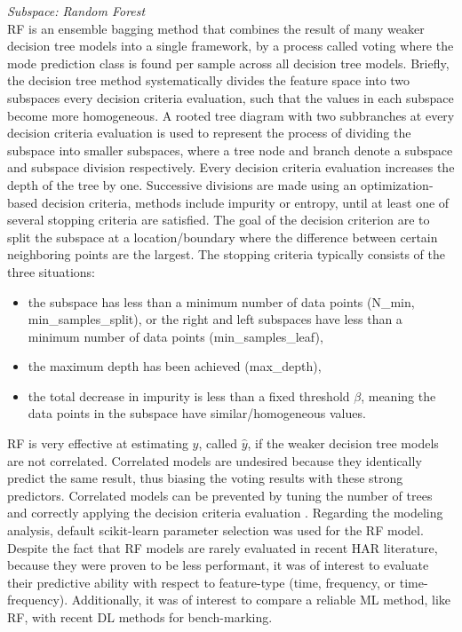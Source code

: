 \documentclass{ieeeaccess}
\begin{document}
\noindent \emph{Subspace: Random Forest}\\
RF is an ensemble bagging method that combines the result of many weaker decision tree models into a single framework, by a process called voting where the mode prediction class is found per sample across all decision tree models. Briefly, the decision tree method systematically divides the feature space into two subspaces every decision criteria evaluation, such that the values in each subspace become more homogeneous. A rooted tree diagram with two subbranches at every decision criteria evaluation is used to represent the process of dividing the subspace into smaller subspaces, where a tree node and branch denote a subspace and subspace division respectively. Every decision criteria evaluation increases the depth of the tree by one. Successive divisions are made using an optimization-based decision criteria, methods include impurity or entropy, until at least one of several stopping criteria are satisfied. The goal of the decision criterion are to split the subspace at a location/boundary where the difference between certain neighboring points are the largest. The stopping criteria typically consists of the three situations:
\begin{itemize}
\item the subspace has less than a minimum number of data points (N\_min, min\_samples\_split), or the right and left subspaces have less than a minimum number of data points (min\_samples\_leaf),
\item the maximum depth has been achieved (max\_depth), 
\item the total decrease in impurity is less than a fixed threshold $\beta$, meaning the data points in the subspace have similar/homogeneous values.
\end{itemize}
RF is very effective at estimating $y$, called $\hat{y}$, if the weaker decision tree models are not correlated. Correlated models are undesired because they identically predict the same result, thus biasing the voting results with these strong predictors. Correlated models can be prevented by tuning the number of trees and correctly applying the decision criteria evaluation \cite{Burkov_2019_ML, Louppe_2012_RF}. Regarding the modeling analysis, default scikit-learn parameter selection was used for the RF model. Despite the fact that RF models are rarely evaluated in recent HAR literature, because they were proven to be less performant, it was of interest to evaluate their predictive ability with respect to feature-type (time, frequency, or time-frequency). Additionally, it was of interest to compare a reliable ML method, like RF, with recent DL methods for bench-marking.\\
\end{document}
